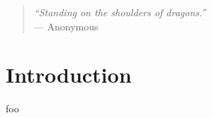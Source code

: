 
\begin{quote}
	\textit{``Standing on the shoulders of dragons.''} \\ --- Anonymous
\end{quote}

\section{Introduction}
\label{sec:introduction}

foo





